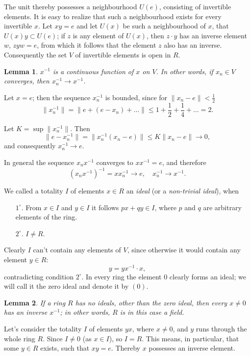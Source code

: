 \documentclass{article}
\newtheorem{lemma}{Lemma}
\theoremstyle{definition}
\begin{document}
The unit thereby possesses a neighbourhood $U(e)$, consisting of invertible elements. It is easy to realize that such a neighbourhood exists for every invertible $x$. Let $xy=e$ and let $U(x)$ be such a neighbourhood of $x$, that $U(x)y\subset U(e)$; if $z$ is any element of $U(x)$, then $z\cdot y$ has an inverse element $w$, $zyw=e$, from which it follows that the element $z$ also has an inverse. Consequently the set $V$ of invertible elements is open in $R$.

\begin{lemma}
  $x^{-1}$ is a continuous function of $x$ on $V$. In other words, if $x_n\in V$ converges, then $x_n^{-1} \to x^{-1}$.
\end{lemma}

Let $x=e$; then the sequence $x_n^{-1}$ is bounded, since for $\|x_n-e\|<\frac12$
$$ \|x_n^{-1}\| = \|e + (e-x_n) + \dots\| \leq 1 + \frac12 + \frac14 + \dots = 2. $$

Let $K=\sup\|x_n^{-1}\|$. Then
$$ \|e-x_n^{-1}\| = \|x_n^{-1}(x_n-e)\| \leq K\|x_n-e\| \to 0,$$
and consequently $x_n^{-1} \to e$.

In general the sequence $x_nx^{-1}$ converges to $xx^{-1}=e$, and therefore
$$ (x_n x^{-1})^{-1} = xx_n^{-1} \to e,\quad x_n^{-1}\to x^{-1}. $$

We called a totality $I$ of elements $x\in R$ an \emph{ideal} (or a \emph{non-trivial ideal}), when
\begin{enumerate}
\item [$1^\circ$.] From $x\in I$ and $y\in I$ it follows $px+qy\in I$, where $p$ and $q$ are arbitrary elements of the ring.
\item [$2^\circ$.] $I\neq R$.
\end{enumerate}

Clearly $I$ can't contain any elements of $V$, since otherwise it would contain any element $y\in R$:
$$ y=yx^{-1}\cdot x, $$
contradicting condition $2^\circ$. In every ring the element $0$ clearly forms an ideal; we will call it the zero ideal and denote it by $(0)$.

\begin{lemma}
  If a ring $R$ has no ideals, other than the zero ideal, then every $x\neq 0$ has an inverse $x^{-1}$; in other words, $R$ is in this case a field.
\end{lemma}

Let's consider the totality $I$ of elements $yx$, where $x\neq 0$, and $y$ runs through the whole ring $R$. Since $I\neq0$ (as $x\in I$), so $I = R$. This means, in particular, that some $y\in R$ exists, such that $xy=e$. Thereby $x$ possesses an inverse element.
\end{document}
